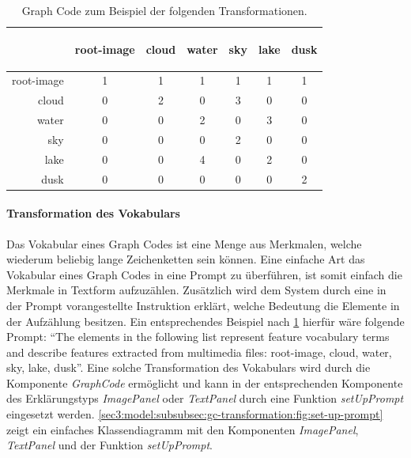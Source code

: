 \begin{table}[htb]
  \begin{tabular}{rcccccc}
    &  \begin{turn}{90}root-image\end{turn}
    & \begin{turn}{90}cloud\end{turn}
    & \begin{turn}{90}water\end{turn}
    & \begin{turn}{90}sky\end{turn}
    & \begin{turn}{90}lake\end{turn}
    & \begin{turn}{90}dusk\end{turn} \\
    \hline

    root-image   & 1 & 1 & 1 & 1 & 1 & 1 \\
    cloud        & 0 & 2 & 0 & 3 & 0 & 0 \\
    water        & 0 & 0 & 2 & 0 & 3 & 0 \\
    sky          & 0 & 0 & 0 & 2 & 0 & 0 \\
    lake         & 0 & 0 & 4 & 0 & 2 & 0 \\
    dusk         & 0 & 0 & 0 & 0 & 0 & 2
  \end{tabular}
  \caption{Graph Code zum Beispiel der folgenden Transformationen.}
  \label{sec3:model:subsubsec:gc-transformation:tab:gc-trans-ex}
\end{table}

\paragraph{Transformation des Vokabulars}
Das Vokabular eines Graph Codes ist eine Menge aus Merkmalen, welche wiederum beliebig lange Zeichenketten sein können.
Eine einfache Art das Vokabular eines Graph Codes in eine Prompt zu überführen, ist somit einfach die Merkmale in Textform aufzuzählen.
Zusätzlich wird dem System durch eine in der Prompt vorangestellte Instruktion erklärt, welche Bedeutung die Elemente in der Aufzählung besitzen.
Ein entsprechendes Beispiel nach \cref{sec3:model:subsubsec:gc-transformation:tab:gc-trans-ex} hierfür wäre folgende Prompt: \enquote{The elements in the following list represent feature vocabulary terms and describe features extracted from multimedia files: root-image, cloud, water, sky, lake, dusk}.
Eine solche Transformation des Vokabulars wird durch die Komponente \textit{GraphCode} ermöglicht und kann in der entsprechenden Komponente des Erklärungstyps \textit{ImagePanel} oder \textit{TextPanel} durch eine Funktion \textit{setUpPrompt} eingesetzt werden.
\cref{sec3:model:subsubsec:gc-transformation:fig:set-up-prompt} zeigt ein einfaches Klassendiagramm mit den Komponenten \textit{ImagePanel}, \textit{TextPanel} und der Funktion \textit{setUpPrompt}.

